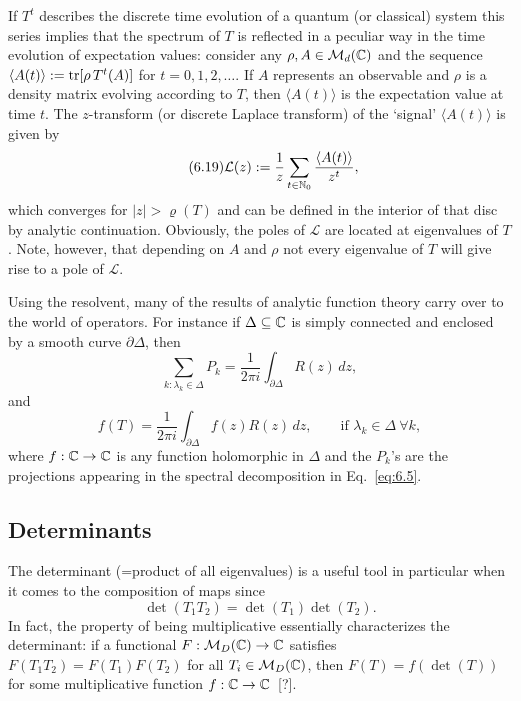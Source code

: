 \documentclass[11pt,a4paper]{article}
\theoremstyle{plain}
\theoremstyle{definition}
\theoremstyle{remark}
\begin{document}
If $T^t$ describes the discrete time evolution of a quantum (or classical) system
this series implies that the spectrum of $T$ is reflected in a peculiar way in
the time evolution of expectation values: consider any $\rho,A\in\mathcal{M}_d(\mathbb{C})$ and
the sequence $\langle A(t)\rangle := \operatorname{tr}[\rho\,T^t(A)]$ for $t=0,1,2,\dots$. If $A$
represents an observable and $\rho$ is a density matrix evolving according to $T$,
then $\langle A(t)\rangle$ is the expectation value at time $t$. The $z$-transform
(or discrete Laplace transform) of the `signal' $\langle A(t)\rangle$ is given by
\begin{equation}\tag{6.19}\label{eq:6.19}
    \mathcal{L}(z)
    := \frac{1}{z}\sum_{t\in\mathbb{N}_0}\frac{\langle A(t)\rangle}{z^t},
\end{equation}
which converges for $|z|>\varrho(T)$ and can be defined in the interior of that
disc by analytic continuation. Obviously, the poles of $\mathcal{L}$ are located
at eigenvalues of $T$. Note, however, that depending on $A$ and $\rho$ not every
eigenvalue of $T$ will give rise to a pole of $\mathcal{L}$.

Using the resolvent, many of the results of analytic function theory carry over
to the world of operators. For instance if $\Delta\subseteq\mathbb{C}$ is simply
connected and enclosed by a smooth curve $\partial\Delta$, then
\begin{equation}\tag{6.20}\label{eq:6.20}
    \sum_{k:\lambda_k\in\Delta} P_k
    = \frac{1}{2\pi i}\int_{\partial\Delta} R(z)\,dz,
\end{equation}
and
\begin{equation}\tag{6.21}\label{eq:6.21}
    f(T)
    = \frac{1}{2\pi i}\int_{\partial\Delta} f(z)R(z)\,dz,
    \qquad
    \text{if } \lambda_k\in\Delta\ \forall k,
\end{equation}
where $f:\mathbb{C}\to\mathbb{C}$ is any function holomorphic in $\Delta$ and the $P_k$'s are the
projections appearing in the spectral decomposition in Eq.~\eqref{eq:6.5}.

\subsection{Determinants}

The determinant (=product of all eigenvalues) is a useful tool in particular when
it comes to the composition of maps since
\begin{equation}\tag{6.22}\label{eq:6.22}
    \det(T_1T_2)=\det(T_1)\det(T_2).
\end{equation}
In fact, the property of being multiplicative essentially characterizes the
determinant: if a functional $F:\mathcal{M}_D(\mathbb{C})\to\mathbb{C}$ satisfies
$F(T_1T_2)=F(T_1)F(T_2)$ for all $T_i\in\mathcal{M}_D(\mathbb{C})$, then
$F(T)=f(\det(T))$ for some multiplicative function $f:\mathbb{C}\to\mathbb{C}$~[?].
\end{document}
